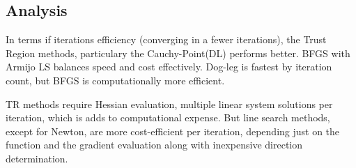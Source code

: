 \documentclass{article}
\begin{document}
\subsection{Analysis}

In terms if iterations efficiency (converging in a fewer iterations), the  Trust Region methods, particulary the Cauchy-Point(DL) performs  better. BFGS with Armijo LS balances speed and cost effectively. Dog-leg is fastest by iteration count, but BFGS is computationally more efficient. 



TR methods require Hessian evaluation, multiple linear system solutions per iteration, which is adds to computational expense. But line search methods, except for Newton, are more cost-efficient per iteration, depending just on the function and the gradient evaluation along with inexpensive direction determination.
\end{document}
